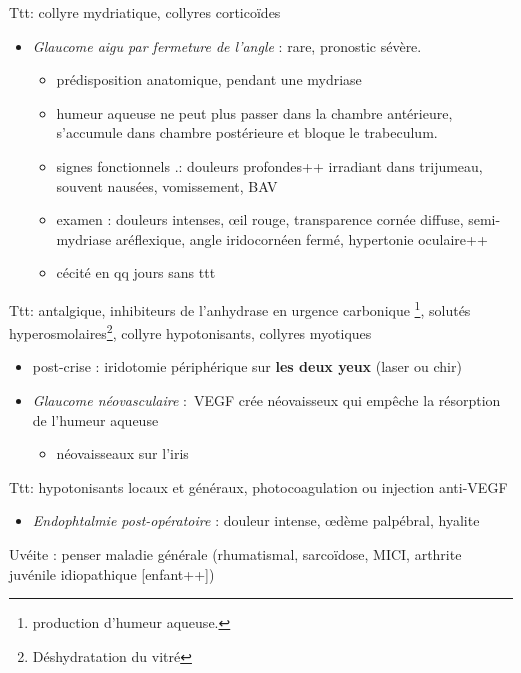 \documentclass[11pt]{article}
\def\ttt{\hspace*{1cm}Ttt: }
\begin{document}
\ttt collyre mydriatique, collyres corticoïdes
\begin{itemize}
\item \emph{Glaucome aigu par fermeture de l'angle} : rare, pronostic sévère.
\begin{itemize}
\item prédisposition anatomique, pendant une mydriase
\item humeur aqueuse ne peut plus passer dans la chambre antérieure, s'accumule
dans chambre postérieure et bloque le trabeculum.
\item signes fonctionnels .: douleurs profondes++ irradiant dans trijumeau,
souvent nausées, vomissement, BAV
\item examen : douleurs intenses, \oe{}il rouge, transparence cornée \dec diffuse,
semi-mydriase aréflexique, angle iridocornéen fermé, hypertonie oculaire++
\item cécité en qq jours sans ttt \danger
\end{itemize}
\end{itemize}
\ttt antalgique, inhibiteurs de l'anhydrase en urgence \skull
    carbonique \footnote{\dec production d'humeur aqueuse.}, solutés hyperosmolaires\footnote{Déshydratation du vitré}, collyre hypotonisants,
    collyres myotiques
\begin{itemize}
\item post-crise : iridotomie périphérique sur \textbf{les deux yeux} (laser ou chir)
\end{itemize}
\begin{itemize}
\item \emph{Glaucome néovasculaire} : VEGF crée néovaisseux qui empêche la résorption de
l'humeur aqueuse
\begin{itemize}
\item néovaisseaux sur l'iris
\end{itemize}
\end{itemize}
\ttt hypotonisants locaux et généraux, photocoagulation ou injection anti-VEGF
\begin{itemize}
\item \emph{Endophtalmie post-opératoire} : douleur intense, \oe{}dème palpébral, hyalite
\end{itemize}

\begin{tcolorbox}
Uvéite : penser maladie générale (rhumatismal, sarcoïdose, MICI, arthrite juvénile idiopathique [enfant++])
\end{tcolorbox}
\end{document}
